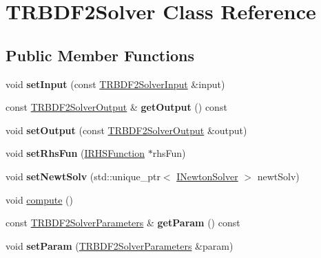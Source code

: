 \hypertarget{classTRBDF2Solver}{
\section{TRBDF2Solver Class Reference}
\label{classTRBDF2Solver}
}
\subsection*{Public Member Functions}
\begin{DoxyCompactItemize}
\item 
\hypertarget{classTRBDF2Solver_a0e317994696c267ea08324e1d7041c59}{
void {\bfseries setInput} (const \hyperlink{classTRBDF2SolverInput}{TRBDF2SolverInput} \&input)}
\label{classTRBDF2Solver_a0e317994696c267ea08324e1d7041c59}

\item 
\hypertarget{classTRBDF2Solver_a8c4b2abc5cdbff58ca9286e7ba899e38}{
const \hyperlink{classTRBDF2SolverOutput}{TRBDF2SolverOutput} \& {\bfseries getOutput} () const }
\label{classTRBDF2Solver_a8c4b2abc5cdbff58ca9286e7ba899e38}

\item 
\hypertarget{classTRBDF2Solver_a37b7ddb1a13f344665990ed84b3efd9e}{
void {\bfseries setOutput} (const \hyperlink{classTRBDF2SolverOutput}{TRBDF2SolverOutput} \&output)}
\label{classTRBDF2Solver_a37b7ddb1a13f344665990ed84b3efd9e}

\item 
\hypertarget{classTRBDF2Solver_a4d482b9450e446cda5491e394aa61b8a}{
void {\bfseries setRhsFun} (\hyperlink{classIRHSFunction}{IRHSFunction} $\ast$rhsFun)}
\label{classTRBDF2Solver_a4d482b9450e446cda5491e394aa61b8a}

\item 
\hypertarget{classTRBDF2Solver_a085c0f2134957bca52d7d0ca60eedf68}{
void {\bfseries setNewtSolv} (std::unique\_\-ptr$<$ \hyperlink{classINewtonSolver}{INewtonSolver} $>$ newtSolv)}
\label{classTRBDF2Solver_a085c0f2134957bca52d7d0ca60eedf68}

\item 
void \hyperlink{classTRBDF2Solver_a852ad825d56d976c1654135a8eb449a1}{compute} ()
\item 
\hypertarget{classTRBDF2Solver_a920ec7e4bfbc6f356254c41e82fe11be}{
const \hyperlink{classTRBDF2SolverParameters}{TRBDF2SolverParameters} \& {\bfseries getParam} () const }
\label{classTRBDF2Solver_a920ec7e4bfbc6f356254c41e82fe11be}

\item 
\hypertarget{classTRBDF2Solver_a3ede6ffaa21cc65f1e641a5ef7e540f8}{
void {\bfseries setParam} (\hyperlink{classTRBDF2SolverParameters}{TRBDF2SolverParameters} \&param)}
\label{classTRBDF2Solver_a3ede6ffaa21cc65f1e641a5ef7e540f8}

\end{DoxyCompactItemize}


